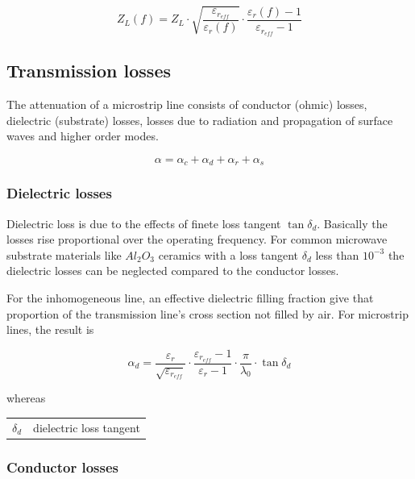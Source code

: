 \documentclass[10pt]{report}
\begin{document}
\begin{equation}
Z_{L}(f) = Z_{L}\cdot\sqrt{\frac{\varepsilon_{r_{eff}}}{\varepsilon_{r}(f)}}\cdot\frac{\varepsilon_{r}(f) - 1}{\varepsilon_{r_{eff}} - 1}
\end{equation}

\subsection{Transmission losses}

The attenuation of a microstrip line consists of conductor (ohmic)
losses, dielectric (substrate) losses, losses due to radiation and
propagation of surface waves and higher order modes.

\begin{equation}
\alpha = \alpha_c + \alpha_d + \alpha_r + \alpha_s
\end{equation}

\subsubsection{Dielectric losses}

Dielectric loss is due to the effects of finete loss tangent
$\tan{\delta_d}$. Basically the losses rise proportional over the
operating frequency.  For common microwave substrate materials like
$Al_2O_3$ ceramics with a loss tangent $\delta_d$ less than $10^{-3}$
the dielectric losses can be neglected compared to the conductor
losses.

\addvspace{12pt}

For the inhomogeneous line, an effective dielectric filling fraction
give that proportion of the transmission line's cross section not
filled by air.  For microstrip lines, the result is

\begin{equation}
\alpha_d = \dfrac{\varepsilon_r}{\sqrt{\varepsilon_{r_{eff}}}}\cdot \dfrac{\varepsilon_{r_{eff}} - 1}{\varepsilon_r - 1}\cdot \dfrac{\pi}{\lambda_0}\cdot \tan{\delta_d}
\end{equation}

whereas

\addvspace{12pt}

\begin{tabular}{rl}
$\delta_d$& dielectric loss tangent
\end{tabular}

\subsubsection{Conductor losses}
\end{document}
